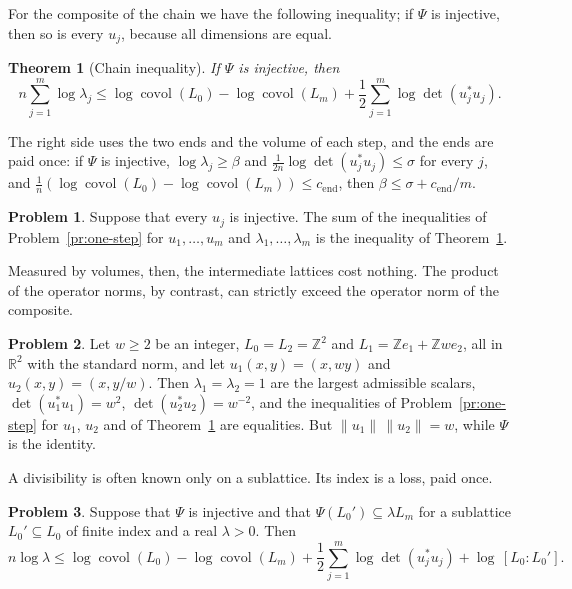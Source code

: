 \documentclass[reqno]{amsart}
\theoremstyle{definition}
\newtheorem{problem}{Problem}[section]
\theoremstyle{plain}
\newtheorem{theorem}{Theorem}[section]
\newcommand{\Z}{\mathbb{Z}}
\newcommand{\R}{\mathbb{R}}
\newcommand{\covol}{\operatorname{covol}}
\begin{document}
For the composite of the chain we have the following inequality; if \(\Psi\) is injective, then so is every \(u_j\), because all dimensions are equal.

\begin{theorem}[Chain inequality]\label{thm:chain}
If \(\Psi\) is injective, then
\[
  n \sum_{j=1}^m \log \lambda_j \le \log \covol(L_0) - \log \covol(L_m) + \frac12 \sum_{j=1}^m \log \det(u_j^* u_j) .
\]
\end{theorem}

The right side uses the two ends and the volume of each step, and the ends are paid once: if \(\Psi\) is injective, \(\log \lambda_j \ge \beta\) and \(\frac{1}{2n} \log \det(u_j^* u_j) \le \sigma\) for every \(j\), and \(\frac1n (\log \covol(L_0) - \log \covol(L_m)) \le c_{\mathrm{end}}\), then \(\beta \le \sigma + c_{\mathrm{end}}/m\).

\begin{problem}\label{pr:stepwise}
Suppose that every \(u_j\) is injective.  The sum of the inequalities of Problem~\ref{pr:one-step} for \(u_1, \dots, u_m\) and \(\lambda_1, \dots, \lambda_m\) is the inequality of Theorem~\ref{thm:chain}.
\end{problem}

Measured by volumes, then, the intermediate lattices cost nothing.  The product of the operator norms, by contrast, can strictly exceed the operator norm of the composite.

\begin{problem}\label{pr:rank-two}
Let \(w \ge 2\) be an integer, \(L_0 = L_2 = \Z^2\) and \(L_1 = \Z e_1 + \Z w e_2\), all in \(\R^2\) with the standard norm, and let \(u_1(x, y) = (x, wy)\) and \(u_2(x, y) = (x, y/w)\).  Then \(\lambda_1 = \lambda_2 = 1\) are the largest admissible scalars, \(\det(u_1^* u_1) = w^2\), \(\det(u_2^* u_2) = w^{-2}\), and the inequalities of Problem~\ref{pr:one-step} for \(u_1\), \(u_2\) and of Theorem~\ref{thm:chain} are equalities.  But \(\lVert u_1 \rVert \, \lVert u_2 \rVert = w\), while \(\Psi\) is the identity.
\end{problem}

A divisibility is often known only on a sublattice.  Its index is a loss, paid once.

\begin{problem}\label{pr:index}
Suppose that \(\Psi\) is injective and that \(\Psi(L_0') \subseteq \lambda L_m\) for a sublattice \(L_0' \subseteq L_0\) of finite index and a real \(\lambda > 0\).  Then
\[
  n \log \lambda \le \log \covol(L_0) - \log \covol(L_m) + \frac12 \sum_{j=1}^m \log \det(u_j^* u_j) + \log\, [L_0 : L_0'] .
\]
\end{problem}
\end{document}
